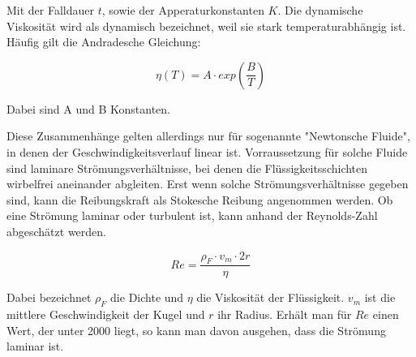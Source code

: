 Mit der Falldauer $t$, sowie der Apperaturkonstanten $K$.
Die dynamische Viskosität wird als dynamisch bezeichnet, weil sie stark 
temperaturabhängig ist. Häufig gilt die Andradesche Gleichung:

\begin{equation}
\eta (T) = A\cdot exp(\frac{B}{T})
\end{equation}

Dabei sind A und B Konstanten. 

Diese Zusammenhänge gelten allerdings nur für sogenannte "Newtonsche Fluide",
in denen der Geschwindigkeitsverlauf linear ist. Vorraussetzung für solche 
Fluide sind laminare Strömungsverhältnisse, bei denen die Flüssigkeitsschichten
wirbelfrei aneinander abgleiten. Erst wenn solche Strömungsverhältnisse gegeben 
sind, kann die Reibungskraft als Stokesche Reibung angenommen werden. 
Ob eine Strömung laminar oder turbulent ist, kann anhand der Reynolds-Zahl 
abgeschätzt werden. 

\begin{equation}
Re = \frac{\rho _F\cdot v_m\cdot 2r}{\eta}
\label{eqn:Reynolds}
\end{equation}

Dabei bezeichnet $\rho _F$ die Dichte und $\eta$ die Viskosität der Flüssigkeit. 
$v_m$ ist die mittlere Geschwindigkeit der Kugel und $r$ ihr Radius.
Erhält man für $Re$ einen Wert, der unter 2000 liegt, so kann man davon ausgehen, 
dass die Strömung laminar ist. 

\cite{sample}
